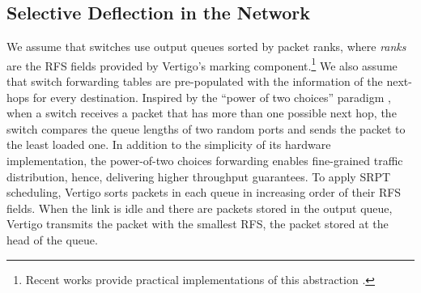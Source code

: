 \subsection{Selective Deflection in the Network}
\label{sec:vertigo}
We assume that switches use output queues sorted by packet ranks, where \emph{ranks} are the RFS fields provided by Vertigo's marking component.\footnote{Recent works provide practical implementations of this abstraction \cite{pifo, pieo}. 
} We also assume that switch forwarding tables are pre-populated with the information of the next-hops for every destination. 
%
Inspired by the 
``power of two choices''
paradigm \cite{poweroftwosurvey}, when a switch receives a packet that has more than one possible next hop, the switch compares the queue lengths of two random ports and sends the packet to the least loaded one. 
In addition to the simplicity of its hardware implementation, the power-of-two choices forwarding enables fine-grained traffic distribution, hence, delivering higher throughput guarantees.  
To apply SRPT scheduling, Vertigo sorts packets in each queue in increasing order of their RFS fields. When the link is idle and there are packets stored in the output queue, Vertigo transmits the packet with the smallest RFS, \ie the packet stored at the head of the queue.


